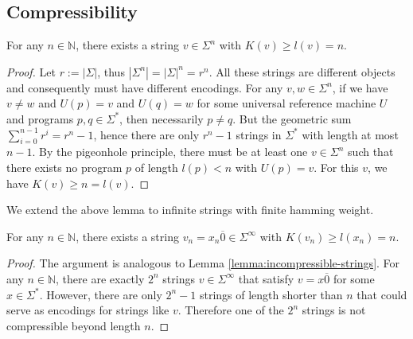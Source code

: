\subsection{Compressibility}
\begin{lemma}
	\label{lemma:incompressible-strings}
	For any $n\in\mathbb{N}$, there exists a string $v\in\Sigma^n$ with $K(v)\geq l(v)=n$.
	
\end{lemma}
\begin{proof}
	Let $r:=|\Sigma|$, thus $|\Sigma^n|=|\Sigma|^n=r^n$.
	All these strings are different objects and consequently must have different encodings.
	For any $v,w\in\Sigma^n$, if we have $v\neq w$ and $U(p)=v$ and $U(q)=w$ for some universal reference machine $U$ and programs $p,q\in\Sigma^*$, then necessarily $p\neq q$.
	But the geometric sum $\sum_{i=0}^{n-1}r^i=r^{n}-1$, hence there are only $r^n-1$ strings in $\Sigma^{*}$ with length at most $n-1$.
	By the pigeonhole principle, there must be at least one $v\in\Sigma^n$ such that there exists no program $p$ of length $l(p)<n$ with $U(p)=v$.
	For this $v$, we have $K(v)\geq n=l(v)$.
\end{proof}
We extend the above lemma to infinite strings with finite hamming weight.
\begin{corollary}
	\label{cor:incompressible-zero-pad}
	For any $n\in\mathbb{N}$, there exists a string $v_n=x_n\overline{0}\in\Sigma^{\infty}$ with $K(v_n)\geq l(x_n)=n$.
\end{corollary}
\begin{proof}
	The argument is analogous to Lemma \ref{lemma:incompressible-strings}.
	For any $n\in\mathbb{N}$, there are exactly $2^n$ strings $v\in\Sigma^{\infty}$ that satisfy $v=x\overline{0}$ for some $x\in\Sigma^{*}$. However, there are only $2^n-1$ strings of length shorter than $n$ that could serve as encodings for strings like $v$.
	Therefore one of the $2^n$ strings is not compressible beyond length $n$.
\end{proof}

